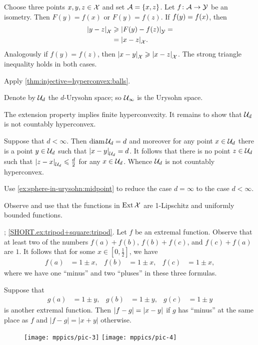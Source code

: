 Choose three points $x,y,z\in\mathcal{X}$ and set $\mathcal{A}=\{x,z\}$.
Let $f\:\spc{A}\z\to \spc{Y}$ be an isometry.
Then $F(y)=f(x)$ or $F(y)=f(z)$.
If  $f(y)\z=f(x)$, then
\begin{align*}
\dist{y}{z}{\spc{X}}&\ge  \dist{F(y)}{f(z)}{\spc{Y}}=
\\
 &=\dist{x}{z}{\spc{X}}.
\end{align*}
Analogously if $f(y)=f(z)$, then $\dist{x}{y}{\spc{X}}\ge\dist{x}{z}{\spc{X}}$.
The strong triangle inequality holds in both cases.

Apply \ref{thm:injective=hyperconvex:balls}.

Denote by $\mathcal{U}_d$ the $d$-Urysohn space;
so $\mathcal{U}_\infty$ is the Urysohn space.

The extension property implies finite hyperconvexity.
It remains to show that $\mathcal{U}_d$ is not countably hyperconvex.

Suppose that $d<\infty$.
Then $\operatorname{\rm diam}\nolimits\mathcal{U}_d=d$ and moreover for any point $x\in\mathcal{U}_d$ there is a point $y\in\mathcal{U}_d$ such that $\dist{x}{y}{\spc{U}_d}=d$.
It follows that there is no point $z\in\mathcal{U}_d$ such that $\dist{z}{x}{\spc{U}_d}\le \tfrac d2$ for any $x\in\mathcal{U}_d$.
Whence $\mathcal{U}_d$ is not countably hyperconvex.

Use \ref{ex:sphere-in-urysohn:midpoint} to reduce the case $d=\infty$ to the case $d<\infty$.

Observe and use that the functions in $\mathop{\rm Ext}\nolimits\mathcal{X}$ are 1-Lipschitz and uniformly bounded functions.

\parbf{\ref{ex:tripod+square}}; \ref{SHORT.ex:tripod+square:tripod}.
Let $f$ be an extremal function.
Observe that at least two of the numbers $f(a)+f(b)$, $f(b)+f(c)$, and $f(c)+f(a)$ are $1$.
It follows that for some $x\in[0,\tfrac12]$, we have 
\begin{align*}
f(a)&=1\pm x,&
f(b)&=1\pm x,&
f(c)&=1\pm x,
\end{align*}
where we have one ``minus'' and two ``pluses'' in these three formulas.

Suppose that
\begin{align*}
g(a)&=1\pm y,& g(b)&=1\pm y,& g(c)&=1\pm y
\end{align*}
is another extremal function.
Then $|f-g|\z=|x-y|$ if $g$ has ``minus'' at the same place as $f$ and $|f-g|=|x+y|$ otherwise.

\begin{wrapfigure}{o}{30 mm}
\vskip-0mm
\centering
\texttt{[image: mppics/pic-3]}
\bigskip
\texttt{[image: mppics/pic-4]}
\end{wrapfigure}


